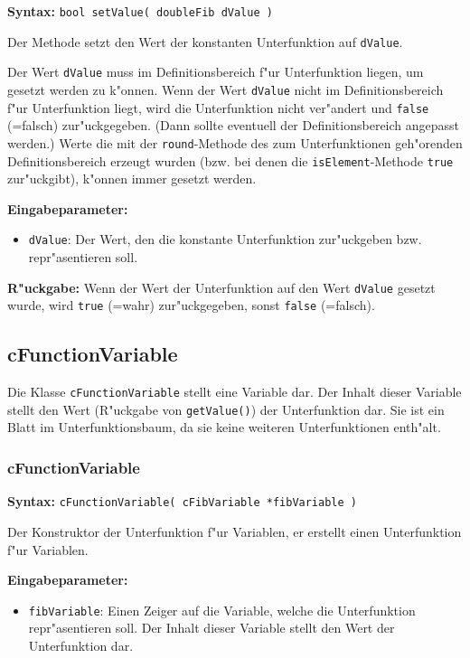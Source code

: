 \textbf{Syntax:} \verb|bool setValue( doubleFib dValue )|

\bigskip\noindent
Der Methode setzt den Wert der konstanten Unterfunktion auf \verb|dValue|.

Der Wert \verb|dValue| muss im Definitionsbereich f"ur Unterfunktion liegen, um gesetzt werden zu k"onnen. Wenn der Wert \verb|dValue| nicht im Definitionsbereich f"ur Unterfunktion liegt, wird die Unterfunktion nicht ver"andert und \verb|false| (=falsch) zur"uckgegeben. (Dann sollte eventuell der Definitionsbereich angepasst werden.) Werte die mit der \verb|round|-Methode des zum Unterfunktionen geh"orenden Definitionsbereich erzeugt wurden (bzw. bei denen die \verb|isElement|-Methode \verb|true| zur"uckgibt), k"onnen immer gesetzt werden.

\bigskip\noindent
\textbf{Eingabeparameter:}
\begin{itemize}
 \item \verb|dValue|: Der Wert, den die konstante Unterfunktion zur"uckgeben bzw. repr"asentieren soll.
\end{itemize}

\bigskip\noindent
\textbf{R"uckgabe:}  Wenn der Wert der Unterfunktion auf den Wert \verb|dValue| gesetzt wurde, wird \verb|true| (=wahr) zur"uckgegeben, sonst \verb|false| (=falsch).



\subsection{cFunctionVariable}

Die Klasse \verb|cFunctionVariable| stellt eine Variable dar. Der Inhalt dieser Variable stellt den Wert (R"uckgabe von \verb|getValue()|) der Unterfunktion dar. Sie ist ein Blatt im Unterfunktionsbaum, da sie keine weiteren Unterfunktionen enth"alt.


\subsubsection{cFunctionVariable}

\textbf{Syntax:} \verb|cFunctionVariable( cFibVariable *fibVariable )|

\bigskip\noindent
Der Konstruktor der Unterfunktion f"ur Variablen, er erstellt einen Unterfunktion f"ur Variablen.

\bigskip\noindent
\textbf{Eingabeparameter:}
\begin{itemize}
 \item \verb|fibVariable|: Einen Zeiger auf die Variable, welche die Unterfunktion repr"asentieren soll. Der Inhalt dieser Variable stellt den Wert der Unterfunktion dar.
\end{itemize}

